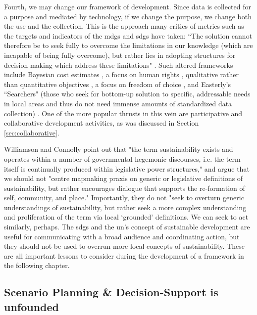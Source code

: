 Fourth, we may change our framework of development. Since data is collected for a purpose and mediated by technology, if we change the purpose, we change both the use and the collection. This is the approach many critics of metrics such as the targets and indicators of the \acp{mdg} and \acp{sdg} have taken: ``The solution cannot therefore be to seek fully to overcome the limitations in our knowledge (which are incapable of being fully overcome), but rather lies in adopting structures for decision-making which address these limitations" \cite{reddyGlobalDevelopmentGoals2008}.	Such altered frameworks include Bayesian cost estimates \cite{reddyGlobalDevelopmentGoals2008}, a focus on human rights \cite{alstonShipsPassingNight2005}, qualitative rather than quantitative objectives \cite{fukuda-parrPowerNumbersCritical2014}, a focus on freedom of choice \cite{senFreedomChoiceConcept1988}, and Easterly's ``Searchers" (those who seek for bottom-up solution to specific, addressable needs in local areas and thus do not need immense amounts of standardized data collection) \cite{easterlyWhiteManBurden2007a}. One of the more popular thrusts in this vein are participative and collaborative development activities, as was discussed in Section \ref{sec:collaborative}.

Williamson and Connolly point out that "the term sustainability exists and operates within a number of governmental hegemonic discourses, i.e. the term itself is continually produced within legislative power structures," and argue that we should not "centre mapmaking praxis on generic or legislative definitions of sustainability, but rather encourages dialogue that supports the re-formation of self, community, and place." Importantly, they do not "seek to overturn generic understandings of sustainability, but rather seek a more complex understanding and proliferation of the term via local `grounded' definitions. \cite{williamsonTheirworkDevelopmentSustainable2011}
We can seek to act similarly, perhaps. The \acp{sdg} and the \ac{un}'s concept of sustainable development are useful for communicating with a broad audience and coordinating action, but they should not be used to overrun more local concepts of sustainability. These are all important lessons to consider during the development of a framework in the following chapter.


\subsection{Scenario Planning \& Decision-Support is unfounded} \label{sec:scenario_critique}

